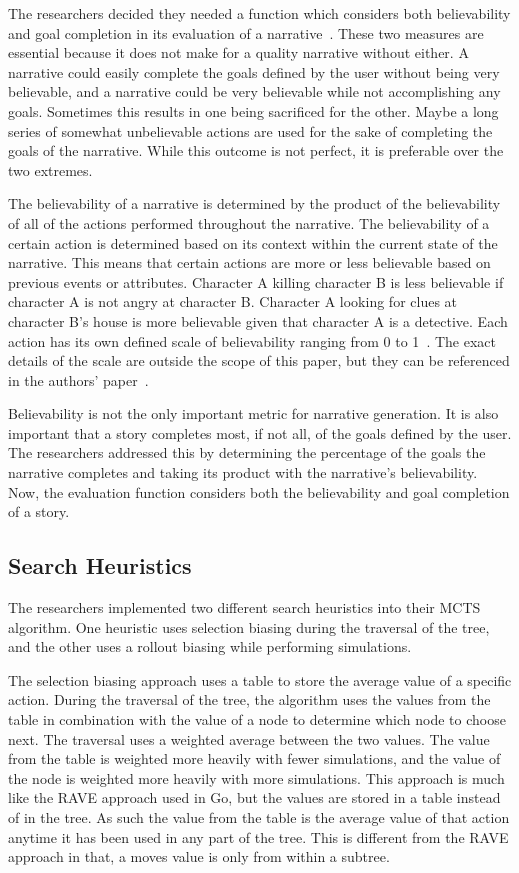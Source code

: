 \documentclass{sig-alternate}
\begin{document}
The researchers decided they needed a function which considers both believability and goal completion in its evaluation of a narrative~\cite{Narrative}. These two measures are essential because it does not make for a quality narrative without either. A narrative could easily complete the goals defined by the user without being very believable, and a narrative could be very believable while not accomplishing any goals. Sometimes this results in one being sacrificed for the other. Maybe a long series of somewhat unbelievable actions are used for the sake of completing the goals of the narrative. While this outcome is not perfect, it is preferable over the two extremes.

The believability of a narrative is determined by the product of the believability of all of the actions performed throughout the narrative. The believability of a certain action is determined based on its context within the current state of the narrative. This means that certain actions are more or less believable based on previous events or attributes. Character A killing character B is less believable if character A is not angry at character B. Character A looking for clues at character B's house is more believable given that character A is a detective. Each action has its own defined scale of believability ranging from 0 to 1~\cite{Narrative}. The exact details of the scale are outside the scope of this paper, but they can be referenced in the authors' paper~\cite{Narrative}.

Believability is not the only important metric for narrative generation. It is also important that a story completes most, if not all, of the goals defined by the user. The researchers addressed this by determining the percentage of the goals the narrative completes and taking its product with the narrative's believability. Now, the evaluation function considers both the believability and goal completion of a story. 

\subsection{Search Heuristics}
The researchers implemented two different search heuristics into their MCTS algorithm. One heuristic uses selection biasing during the traversal of the tree, and the other uses a rollout biasing while performing simulations.

The selection biasing approach uses a table to store the average value of a specific action. During the traversal of the tree, the algorithm uses the values from the table in combination with the value of a node to determine which node to choose next. The traversal uses a weighted average between the two values. The value from the table is weighted more heavily with fewer simulations, and the value of the node is weighted more heavily with more simulations. This approach is much like the RAVE approach used in Go, but the values are stored in a table instead of in the tree. As such the value from the table is the average value of that action anytime it has been used in any part of the tree. This is different from the RAVE approach in that,
a moves value is only from within a subtree.
\end{document}
